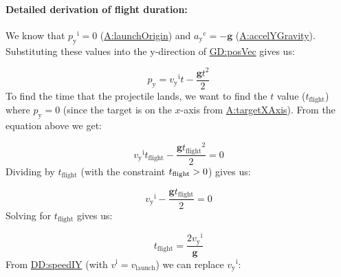 \documentclass[12pt]{article}
\newcommand{\gt}{\ensuremath >}
\begin{document}
\paragraph{Detailed derivation of flight duration:}
\label{IM:calOfLandingTimeDeriv}
We know that ${{p_{\text{y}}}^{\text{i}}}=0$ (\hyperref[launchOrigin]{A:launchOrigin}) and ${{a_{\text{y}}}^{\text{c}}}=-\mathbf{g}$ (\hyperref[accelYGravity]{A:accelYGravity}). Substituting these values into the y-direction of \hyperref[GD:posVec]{GD:posVec} gives us:

\begin{displaymath}
{p_{\text{y}}}={{v_{\text{y}}}^{\text{i}}} t-\frac{\mathbf{g} t^{2}}{2}
\end{displaymath}
To find the time that the projectile lands, we want to find the $t$ value (${t_{\text{flight}}}$) where ${p_{\text{y}}}=0$ (since the target is on the $x$-axis from \hyperref[targetXAxis]{A:targetXAxis}). From the equation above we get:

\begin{displaymath}
{{v_{\text{y}}}^{\text{i}}} {t_{\text{flight}}}-\frac{\mathbf{g} {t_{\text{flight}}}^{2}}{2}=0
\end{displaymath}
Dividing by ${t_{\text{flight}}}$ (with the constraint ${t_{\text{flight}}}\gt{}0$) gives us:

\begin{displaymath}
{{v_{\text{y}}}^{\text{i}}}-\frac{\mathbf{g} {t_{\text{flight}}}}{2}=0
\end{displaymath}
Solving for ${t_{\text{flight}}}$ gives us:

\begin{displaymath}
{t_{\text{flight}}}=\frac{2 {{v_{\text{y}}}^{\text{i}}}}{\mathbf{g}}
\end{displaymath}
From \hyperref[DD:speedIY]{DD:speedIY} (with ${v^{\text{i}}}={v_{\text{launch}}}$) we can replace ${{v_{\text{y}}}^{\text{i}}}$:
\end{document}
